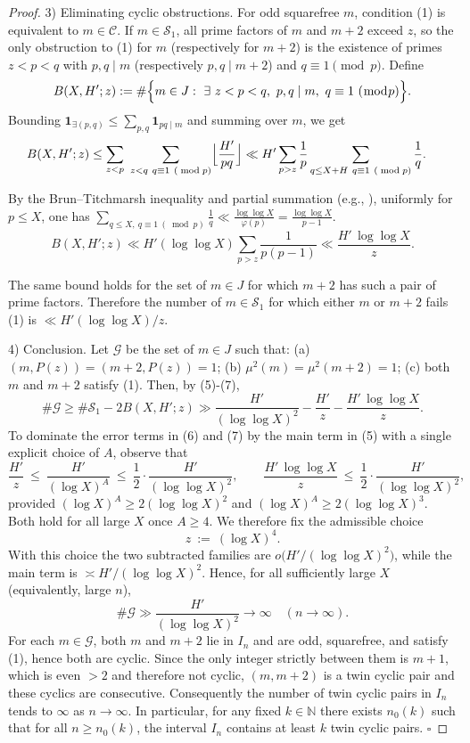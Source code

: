 \begin{proof}
3) Eliminating cyclic obstructions. For odd squarefree $m$, condition (1) is equivalent to $m\in\mathcal C$. If $m\in\mathcal{S}_1$, all prime factors of $m$ and $m+2$ exceed $z$, so the only obstruction to (1) for $m$ (respectively for $m+2$) is the existence of primes $z<p<q$ with $p,q\mid m$ (respectively $p,q\mid m+2$) and $q\equiv 1\pmod p$. Define
$$B(X,H';z):=\#\Bigl\{m\in J:\ \exists\ z<p<q,\ p,q\mid m,\ q\equiv 1\ (\bmod p)\Bigr\}.$$
Bounding $\mathbf{1}_{\exists(p,q)}\le\sum_{p,q}\mathbf{1}_{pq\mid m}$ and summing over $m$, we get
\begin{align*}
B(X,H';z)
&\le \sum_{z<p}\ \sum_{\substack{z<q\ q\equiv 1\ (\bmod p)}}\Bigl\lfloor \frac{H'}{pq}\Bigr\rfloor
\ll H'\sum_{p>z}\frac{1}{p}\sum_{\substack{q\le X+H\ q\equiv 1\ (\bmod p)}}\frac{1}{q}.
\end{align*}
\begin{flushleft}
By the Brun--Titchmarsh inequality and partial summation (e.g., \cite{MV2007,IK2004}), uniformly for $p\le X$, one has $\sum_{q\le X,\ q\equiv 1\ (\bmod p)}\!\frac{1}{q}\ll \frac{\log\log X}{\varphi(p)}=\frac{\log\log X}{p-1}$.
$$B(X,H';z)\ll H'(\log\log X)\sum_{p>z}\frac{1}{p(p-1)}\ll \frac{H'\,\log\log X}{z}.\tag{7}$$
\end{flushleft}
The same bound holds for the set of $m\in J$ for which $m+2$ has such a pair of prime factors. Therefore the number of $m\in\mathcal{S}_1$ for which either $m$ or $m+2$ fails (1) is $\ll H'(\log\log X)/z$.

4) Conclusion. Let $\mathcal{G}$ be the set of $m\in J$ such that: (a) $(m,P(z))=(m+2,P(z))=1$; (b) $\mu^2(m)=\mu^2(m+2)=1$; (c) both $m$ and $m+2$ satisfy (1). Then, by (5)-(7),
$$\#\mathcal{G}\ge \#\mathcal{S}_1-2B(X,H';z)\gg \frac{H'}{(\log\log X)^2}-\frac{H'}{z}-\frac{H'\,\log\log X}{z}.$$
To dominate the error terms in (6) and (7) by the main term in (5) with a single explicit choice of $A$, observe that
\[
 \frac{H'}{z}\ \le\ \frac{H'}{(\log X)^A}\ \le\ \frac{1}{2}\cdot\frac{H'}{(\log\log X)^2},\qquad
 \frac{H'\,\log\log X}{z}\ \le\ \frac{1}{2}\cdot\frac{H'}{(\log\log X)^2},
\]
provided $(\log X)^A\ge 2(\log\log X)^2$ and $(\log X)^A\ge 2(\log\log X)^3$. Both hold for all large $X$ once $A\ge4$. We therefore fix the admissible choice
\[
 z\ :=\ (\log X)^4.
\]
With this choice the two subtracted families are $o\!\bigl(H'/(\log\log X)^2\bigr)$, while the main term is $\asymp H'/(\log\log X)^2$. Hence, for all sufficiently large $X$ (equivalently, large $n$),
$$\#\mathcal{G}\gg \frac{H'}{(\log\log X)^2}\to\infty\quad(n\to\infty).$$
For each $m\in\mathcal{G}$, both $m$ and $m+2$ lie in $I_n$ and are odd, squarefree, and satisfy (1), hence both are cyclic. Since the only integer strictly between them is $m+1$, which is even $>2$ and therefore not cyclic, $(m,m+2)$ is a twin cyclic pair and these cyclics are consecutive. Consequently the number of twin cyclic pairs in $I_n$ tends to $\infty$ as $n\to\infty$. In particular, for any fixed $k\in\mathbb N$ there exists $n_0(k)$ such that for all $n\ge n_0(k)$, the interval $I_n$ contains at least $k$ twin cyclic pairs. $\square$
\end{proof}
